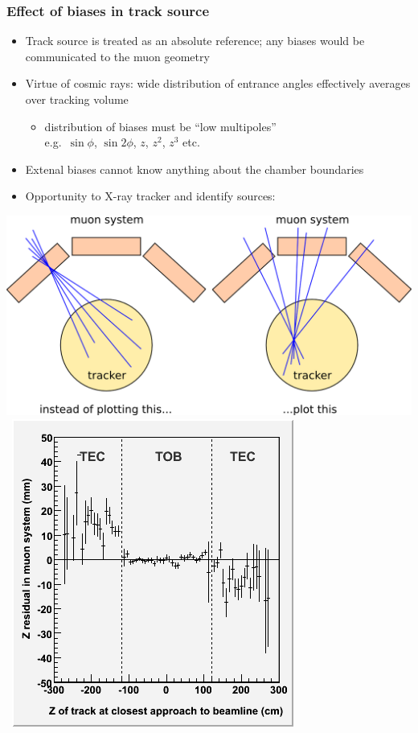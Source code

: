 \documentclass[compress]{beamer}
\begin{document}
\begin{frame}
\frametitle{Effect of biases in track source}

\begin{itemize}
\item Track source is treated as an absolute reference; any biases would be communicated to the muon geometry
\item Virtue of cosmic rays: wide distribution of entrance angles effectively averages over tracking volume
\begin{itemize}
\item distribution of biases must be ``low multipoles'' \\ e.g.\ $\sin\phi$, $\sin 2\phi$, $z$, $z^2$, $z^3$ etc.
\end{itemize}
\item Extenal biases cannot know anything about the chamber boundaries
\item Opportunity to X-ray tracker and identify sources:
\end{itemize}

\mbox{\hspace{-0.5 cm}\includegraphics[height=3.8 cm]{tracker_xray.png} \hspace{0.3 cm} \includegraphics[height=4.2 cm]{zresid_from_tracker_outerbottom.png}}
\end{frame}
\end{document}
